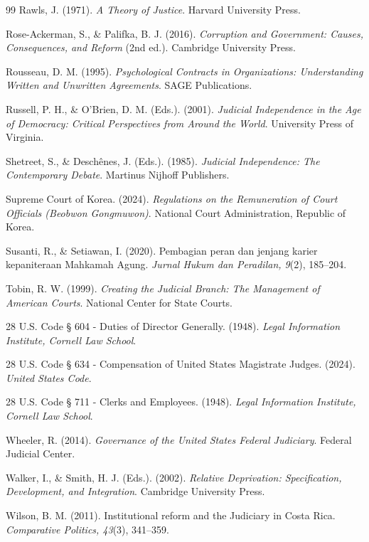 \documentclass[12pt, a4paper]{article}
\begin{document}
\begin{thebibliography}{99}
Rawls, J. (1971). \textit{A Theory of Justice}. Harvard University Press.

Rose-Ackerman, S., \& Palifka, B. J. (2016). \textit{Corruption and Government: Causes, Consequences, and Reform} (2nd ed.). Cambridge University Press.

Rousseau, D. M. (1995). \textit{Psychological Contracts in Organizations: Understanding Written and Unwritten Agreements}. SAGE Publications.

Russell, P. H., \& O'Brien, D. M. (Eds.). (2001). \textit{Judicial Independence in the Age of Democracy: Critical Perspectives from Around the World}. University Press of Virginia.

Shetreet, S., \& Deschênes, J. (Eds.). (1985). \textit{Judicial Independence: The Contemporary Debate}. Martinus Nijhoff Publishers.

Supreme Court of Korea. (2024). \textit{Regulations on the Remuneration of Court Officials (Beobwon Gongmuwon)}. National Court Administration, Republic of Korea.

Susanti, R., \& Setiawan, I. (2020). Pembagian peran dan jenjang karier kepaniteraan Mahkamah Agung. \textit{Jurnal Hukum dan Peradilan, 9}(2), 185--204.

Tobin, R. W. (1999). \textit{Creating the Judicial Branch: The Management of American Courts}. National Center for State Courts.

28 U.S. Code § 604 - Duties of Director Generally. (1948). \textit{Legal Information Institute, Cornell Law School}.

28 U.S. Code § 634 - Compensation of United States Magistrate Judges. (2024). \textit{United States Code}.

28 U.S. Code § 711 - Clerks and Employees. (1948). \textit{Legal Information Institute, Cornell Law School}.

Wheeler, R. (2014). \textit{Governance of the United States Federal Judiciary}. Federal Judicial Center.

Walker, I., \& Smith, H. J. (Eds.). (2002). \textit{Relative Deprivation: Specification, Development, and Integration}. Cambridge University Press.

Wilson, B. M. (2011). Institutional reform and the Judiciary in Costa Rica. \textit{Comparative Politics, 43}(3), 341--359.


\end{thebibliography}
\end{document}
